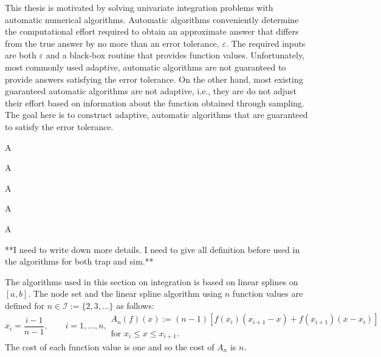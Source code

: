 \documentclass{iitthesis}
\theoremstyle{definition}
\theoremstyle{remark}
\begin{document}
This thesis is motivated by solving univariate integration problems with automatic numerical algorithms. Automatic algorithms conveniently determine the computational effort required to obtain an approximate answer that differs from the true answer by no more than an error tolerance, $\varepsilon$.  The required inputs are both $\varepsilon$ and a black-box routine that provides function values.  Unfortunately, most commonly used adaptive, automatic algorithms are not guaranteed to provide answers satisfying the error tolerance. On the other hand, most existing guaranteed automatic algorithms are not adaptive, i.e., they are do not adjust their effort based on information about the function obtained through sampling.  The goal here is to construct adaptive, automatic algorithms that are guaranteed to satisfy the error tolerance.

 \label{sec:trap}

A


A


A


A


A


\clearpage





**I need to write down more details. I need to give all definition before used in the algorithms for both trap and sim.**

The algorithms used in this section on integration is based on linear splines on $[a,b]$.  The node set and the linear spline algorithm using $n$ function values are defined for $n \in \mathcal{I}:=\{2,3,\ldots\}$ as follows:
\begin{subequations} \label{linearspline}
\begin{equation}
x_i=\frac{i-1}{n-1}, \qquad i=1, \ldots, n,
\end{equation}
\begin{multline}
A_{n}(f)(x):=(n-1) \left[ f(x_{i})(x_{i+1}-x) +f(x_{i+1})(x-x_i) \right] \\ \text{for }x_i \leq x \leq x_{i+1}.
\end{multline}
\end{subequations}
The cost of each function value is one and so the cost of  $A_n$ is $n$.
\end{document}
